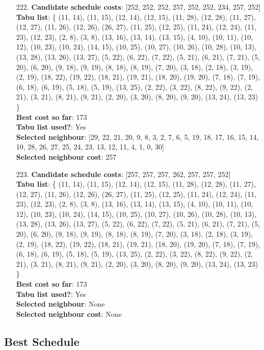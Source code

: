 \documentclass[fleqn]{article}
\begin{document}
\begin{itemize}
    \item[222.] \textbf{Candidate schedule costs}: [252, 252, 252, 257, 252, 252, 234, 257, 252] \\
    \textbf{Tabu list}: \{ (11, 14), (11, 15), (12, 14), (12, 15), (11, 28), (12, 28), (11, 27), (12, 27), (11, 26), (12, 26), (26, 27), (11, 25), (12, 25), (11, 24), (12, 24), (11, 23), (12, 23), (2, 8), (3, 8), (13, 16), (13, 14), (13, 15), (4, 10), (10, 11), (10, 12), (10, 23), (10, 24), (14, 15), (10, 25), (10, 27), (10, 26), (10, 28), (10, 13), (13, 28), (13, 26), (13, 27), (5, 22), (6, 22), (7, 22), (5, 21), (6, 21), (7, 21), (5, 20), (6, 20), (9, 18), (9, 19), (8, 18), (8, 19), (7, 20), (3, 18), (2, 18), (3, 19), (2, 19), (18, 22), (19, 22), (18, 21), (19, 21), (18, 20), (19, 20), (7, 18), (7, 19), (6, 18), (6, 19), (5, 18), (5, 19), (13, 25), (2, 22), (3, 22), (8, 22), (9, 22), (2, 21), (3, 21), (8, 21), (9, 21), (2, 20), (3, 20), (8, 20), (9, 20), (13, 24), (13, 23) \} \\
    \textbf{Best cost so far}: 173 \\
    \textbf{Tabu list used?}: Yes \\
    \textbf{Selected neighbour}: [29, 22, 21, 20, 9, 8, 3, 2, 7, 6, 5, 19, 18, 17, 16, 15, 14, 10, 28, 26, 27, 25, 24, 23, 13, 12, 11, 4, 1, 0, 30] \\
    \textbf{Selected neighbour cost}: 257
      

    \item[223.] \textbf{Candidate schedule costs}: [257, 257, 257, 262, 257, 257, 252] \\
    \textbf{Tabu list}: \{ (11, 14), (11, 15), (12, 14), (12, 15), (11, 28), (12, 28), (11, 27), (12, 27), (11, 26), (12, 26), (26, 27), (11, 25), (12, 25), (11, 24), (12, 24), (11, 23), (12, 23), (2, 8), (3, 8), (13, 16), (13, 14), (13, 15), (4, 10), (10, 11), (10, 12), (10, 23), (10, 24), (14, 15), (10, 25), (10, 27), (10, 26), (10, 28), (10, 13), (13, 28), (13, 26), (13, 27), (5, 22), (6, 22), (7, 22), (5, 21), (6, 21), (7, 21), (5, 20), (6, 20), (9, 18), (9, 19), (8, 18), (8, 19), (7, 20), (3, 18), (2, 18), (3, 19), (2, 19), (18, 22), (19, 22), (18, 21), (19, 21), (18, 20), (19, 20), (7, 18), (7, 19), (6, 18), (6, 19), (5, 18), (5, 19), (13, 25), (2, 22), (3, 22), (8, 22), (9, 22), (2, 21), (3, 21), (8, 21), (9, 21), (2, 20), (3, 20), (8, 20), (9, 20), (13, 24), (13, 23) \} \\
    \textbf{Best cost so far}: 173 \\
    \textbf{Tabu list used?}: Yes \\
    \textbf{Selected neighbour}: None \\
    \textbf{Selected neighbour cost}: None
      
  \end{itemize}

  \subsection{Best Schedule}
\end{document}
